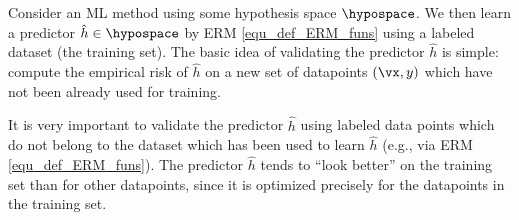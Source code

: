 \documentclass[12pt]{report}
\begin{document}
Consider an ML method using some hypothesis space $\hypospace$. 
We then learn a predictor $\hat{h} \in \hypospace$ by ERM \eqref{equ_def_ERM_funs} 
using a labeled dataset (the training set). The basic idea of validating the 
predictor $\hat{h}$ is simple: compute the empirical risk of $\hat{h}$ on a 
new set of datapoints $(\vx,y)$ which have not been already used for training. 

It is very important to validate the predictor $\hat{h}$ using labeled data 
points which do not belong to the dataset which has been used to learn 
$\hat{h}$ (e.g., via ERM \eqref{equ_def_ERM_funs}). The predictor $\hat{h}$ 
tends to ``look better'' on the training set than for other datapoints, 
since it is optimized precisely for the datapoints in the training set. 
\vspace*{2mm}
\begin{center}
\end{center}
 
\end{document}
